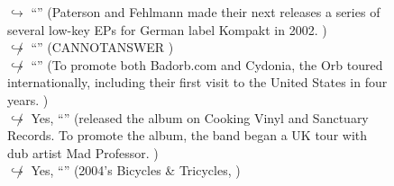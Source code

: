 \documentclass[11pt,a4paper, onecolumn]{article}
\begin{document}
\begin{figure}[t] \small \begin{tcolorbox}[boxsep=0pt,left=5pt,right=0pt,top=2pt,colback = yellow!5] \begin{dialogue}
 \small 
\colorbox{pink!25}{$\hookrightarrow$}
{ ``'' (Paterson and Fehlmann made their next releases a series of several low-key EPs for German label Kompakt in 2002. ) }
\\
\colorbox{pink!25}{$\not\hookrightarrow$}
{ ``'' (CANNOTANSWER ) }
\\
\colorbox{pink!25}{$\not\hookrightarrow$}
{ ``'' (To promote both Badorb.com and Cydonia, the Orb toured internationally, including their first visit to the United States in four years. ) }
\\
\colorbox{pink!25}{$\not\hookrightarrow$}
\colorbox{red!25}{Yes,}
{ ``'' (released the album on Cooking Vinyl and Sanctuary Records. To promote the album, the band began a UK tour with dub artist Mad Professor. ) }
\\
\colorbox{pink!25}{$\not\hookrightarrow$}
\colorbox{red!25}{Yes,}
{ ``'' (2004's Bicycles & Tricycles, ) }
\\
 \end{dialogue}\end{tcolorbox}\end{figure}
\end{document}
